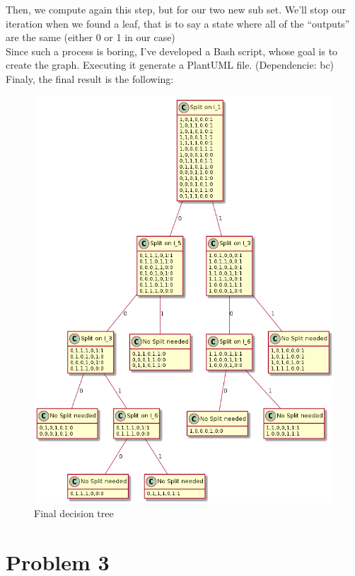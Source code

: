 \documentclass{article}
\begin{document}
            Then, we compute again this step, but for our two new sub set. We'll stop our iteration when we found a leaf, that is to say a state where all of the ``outputs'' are the same (either 0 or 1 in our case)\\
            Since such a process is boring, I've developed a Bash script, whose goal is to create the graph. Executing it generate a PlantUML file. (Dependencie: bc)\\

            Finaly, the final result is the following:
            \begin{figure}[H]
                \centering
                \includegraphics[scale=0.5]{problem2/graph.png}
                \caption{Final decision tree}
                \label{Final decision tree}
            \end{figure}


    \section{Problem 3}
\end{document}

